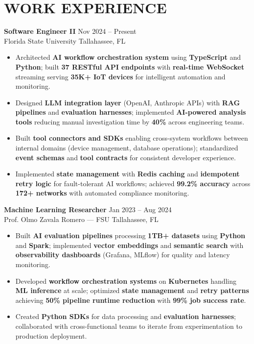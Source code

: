 \documentclass[letterpaper,10pt]{article}
\newcommand{\resumeItem}[1]{\item\small #1}
\newcommand{\resumeSubheading}[4]{
  \vspace{6pt}
  \noindent
  \textbf{#1} \hfill {\footnotesize #2} \\
  [-1pt]
  \noindent
  \small #3 \hfill {\small #4}
  \vspace{3pt}
}
\newcommand{\resumeItemsStart}{\vspace{-2pt}\begin{itemize}}
\newcommand{\resumeItemsEnd}{\end{itemize}\vspace{6pt}}
\begin{document}
\section{\textcolor{metablue}{WORK EXPERIENCE}}
\vspace{-12pt}

\resumeSubheading
{Software Engineer II}{Nov 2024 -- Present}
{Florida State University}{Tallahassee, FL}
\resumeItemsStart
\resumeItem{Architected \textbf{AI workflow orchestration system} using \textbf{TypeScript} and \textbf{Python}; built \textbf{37 RESTful API endpoints} with \textbf{real-time WebSocket} streaming serving \textbf{35K+ IoT devices} for intelligent automation and monitoring.}
\resumeItem{Designed \textbf{LLM integration layer} (OpenAI, Anthropic APIs) with \textbf{RAG pipelines} and \textbf{evaluation harnesses}; implemented \textbf{AI-powered analysis tools} reducing manual investigation time by \textbf{40\%} across engineering teams.}
\resumeItem{Built \textbf{tool connectors and SDKs} enabling cross-system workflows between internal domains (device management, database operations); standardized \textbf{event schemas} and \textbf{tool contracts} for consistent developer experience.}
\resumeItem{Implemented \textbf{state management} with \textbf{Redis caching} and \textbf{idempotent retry logic} for fault-tolerant AI workflows; achieved \textbf{99.2\% accuracy} across \textbf{172+ networks} with automated compliance monitoring.}
\resumeItemsEnd
\vspace{-12pt}

\resumeSubheading
{Machine Learning Researcher}{Jan 2023 -- Aug 2024}
{Prof. Olmo Zavala Romero — FSU}{Tallahassee, FL}
\resumeItemsStart
\resumeItem{Built \textbf{AI evaluation pipelines} processing \textbf{1TB+ datasets} using \textbf{Python} and \textbf{Spark}; implemented \textbf{vector embeddings} and \textbf{semantic search} with \textbf{observability dashboards} (Grafana, MLflow) for quality and latency monitoring.}
\resumeItem{Developed \textbf{workflow orchestration systems} on \textbf{Kubernetes} handling \textbf{ML inference} at scale; optimized \textbf{state management} and \textbf{retry patterns} achieving \textbf{50\% pipeline runtime reduction} with \textbf{99\% job success rate}.}
\resumeItem{Created \textbf{Python SDKs} for data processing and \textbf{evaluation harnesses}; collaborated with cross-functional teams to iterate from experimentation to production deployment.}
\resumeItemsEnd
\vspace{-12pt}
\end{document}
